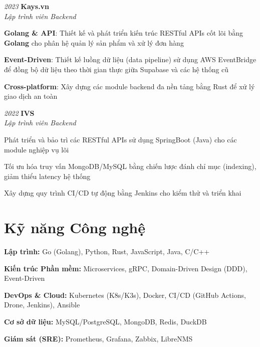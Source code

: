\begin{twocolentry}{\textit{2023}}
    \textbf{Kays.vn} \\[4pt]
    \textit{Lập trình viên Backend}
\end{twocolentry}
\begin{onecolentry}
    \begin{highlights}
        \item \textbf{Golang \& API}: Thiết kế và phát triển kiến trúc RESTful APIs cốt lõi bằng \textbf{Golang} cho phân hệ quản lý sản phẩm và xử lý đơn hàng
        \item \textbf{Event-Driven}: Thiết kế luồng dữ liệu (data pipeline) sử dụng AWS EventBridge để đồng bộ dữ liệu theo thời gian thực giữa Supabase và các hệ thống cũ
        \item \textbf{Cross-platform}: Xây dựng các module backend đa nền tảng bằng Rust để xử lý giao dịch an toàn
    \end{highlights}
\end{onecolentry}
\vspace{0.2 cm}

\begin{twocolentry}{\textit{2022}}
    \textbf{IVS} \\[4pt]
    \textit{Lập trình viên Backend}
\end{twocolentry}
\begin{onecolentry}
    \begin{highlights}
        \item Phát triển và bảo trì các RESTful APIs sử dụng SpringBoot (Java) cho các module nghiệp vụ lõi
        \item Tối ưu hóa truy vấn MongoDB/MySQL bằng chiến lược đánh chỉ mục (indexing), giảm thiểu latency hệ thống
        \item Xây dựng quy trình CI/CD tự động bằng Jenkins cho kiểm thử và triển khai
    \end{highlights}
\end{onecolentry}

\section{Kỹ năng Công nghệ}
\begin{onecolentry}
\begin{highlights}
    \item \textbf{Lập trình:} Go (Golang), Python, Rust, JavaScript, Java, C/C++
    \item \textbf{Kiến trúc Phần mềm:} Microservices, gRPC, Domain-Driven Design (DDD), Event-Driven
    \item \textbf{DevOps \& Cloud:} Kubernetes (K8s/K3s), Docker, CI/CD (GitHub Actions, Drone, Jenkins), Ansible
    \item \textbf{Cơ sở dữ liệu:} MySQL/PostgreSQL, MongoDB, Redis, DuckDB
    \item \textbf{Giám sát (SRE):} Prometheus, Grafana, Zabbix, LibreNMS
\end{highlights}
\end{onecolentry}

